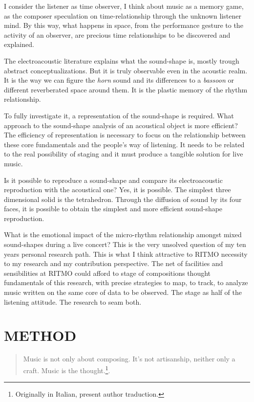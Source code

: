 \documentclass[
	12pt,
	a4paper,
	twocolumn
	]{article}
\begin{document}
I consider the listener as time observer, I think about music as a memory game, as the composer speculation on time-relationship through the unknown listener mind. By this way, what happens in space, from the performance gesture to the activity of an observer, are precious time relationships to be discovered and explained.

The electroacoustic literature explains what the sound-shape is, mostly trough abstract conceptualizations. But it is truly observable even in the acoustic realm. It is the way we can figure the \emph{horn} sound and its differences to a \emph{bassoon} or different reverberated space around them. It is the plastic memory of the rhythm relationship.

To fully investigate it, a representation of the sound-shape is required. What approach to the sound-shape analysis of an acoustical object is more efficient? The efficiency of representation is necessary to focus on the relationship between these core fundamentals and the people's way of listening. It needs to be related to the real possibility of staging and it must produce a tangible solution for live music. 

Is it possible to reproduce a sound-shape and compare its electroacoustic reproduction with the acoustical one? Yes, it is possible. The simplest three dimensional solid is the tetrahedron. Through the diffusion of sound by its four faces, it is possible to obtain the simplest and more efficient sound-shape reproduction. 

What is the emotional impact of the micro-rhythm relationship amongst mixed sound-shapes during a live concert? This is the very unsolved question of my ten years personal research path. This is what I think attractive to RITMO necessity to my research and my contribution perspective. The net of facilities and sensibilities at RITMO could afford to stage of compositions thought fundamentals of this research, with precise strategies to map, to track, to analyze music written on the same core of data to be observed. The stage as half of the listening attitude. The research to seam both.


\section*{METHOD}

\begin{quote}
Music is not only about composing. It’s not artisanship, neither only a craft. Music is the thought.\footnote{Originally in Italian, present author traduction.}\cite{nono85}.
\end{quote}
\end{document}
